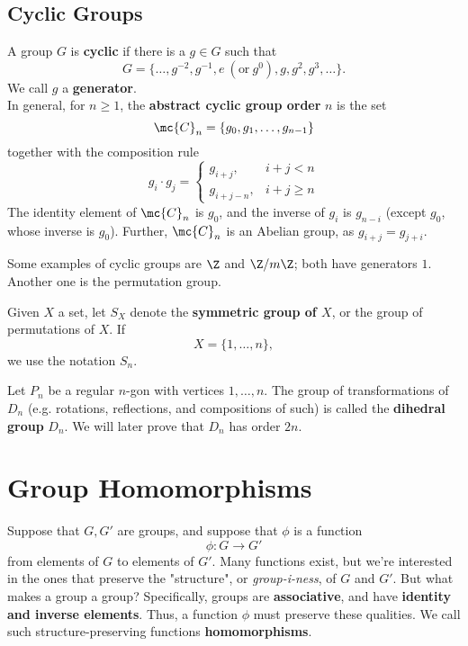 \documentclass[math1530-lecture-notes]{subfiles}
\begin{document}
\subsection{Cyclic Groups}
\begin{definition}{}
  A group $G$ is \textbf{cyclic} if there is a $g\in G$ such that \[
    G=\{ \ldots,g^{-2},g^{-1} ,e\ (\text{or}~g^{0}),g,g^2,g^3,\ldots\}
  .\] We call $g$ a \textbf{generator}.\\
  \indent In general, for $n\ge 1$, the \textbf{abstract cyclic group order} $n$ is the set \[
    \mc{C}_n = \{ g_0,g_1,\ldots,g_{n-1} \}
  \] together with the composition rule \[
    g_i\cdot g_j = \left\{\begin{array}{lr} g_{i+j}, & i+j<n \\ g_{i+j-n}, & i+j\ge n\end{array}\right.
  \] The identity element of $\mc{C}_n$ is $g_0$, and the inverse of $g_i$ is $g_{n-i}$ (except
  $g_0$, whose inverse is $g_0$). Further, $\mc{C}_n$ is an Abelian group, as $g_{i+j}=g_{j+i}$.
\end{definition}

Some examples of cyclic groups are $\Z$ and $\Z / m\Z$; both have generators $1$. Another one is
the permutation group.
\begin{definition}{}
  Given $X$ a set, let $S_X$ denote the  \textbf{symmetric group of $X$}, or the group of
  permutations of $X$. If  \[
    X=\{ 1,\ldots,n \}
  ,\] we use the notation $S_n$.

  Let $P_n$ be a regular  $n$-gon with vertices $1,\ldots,n$. The group of transformations of $D_n$
  (e.g. rotations, reflections, and compositions of such) is called the  \textbf{dihedral group}
  $D_n$. We will later prove that $D_n$ has order  $2n$.
\end{definition}


\section{Group Homomorphisms}

Suppose that $G,G'$ are groups, and suppose that $\phi$ is a function \[
  \phi:G \longrightarrow G'
\]  from elements of $G$ to elements of $G'$. Many functions exist, but we're interested in the ones
that preserve the "structure", or \textit{group-i-ness}, of $G$ and $G'$. But what makes a group a
group? Specifically, groups are \textbf{associative}, and have \textbf{identity and inverse
elements}. Thus, a function $\phi$ must preserve these qualities. We call such structure-preserving
functions \textbf{homomorphisms}.
\end{document}

